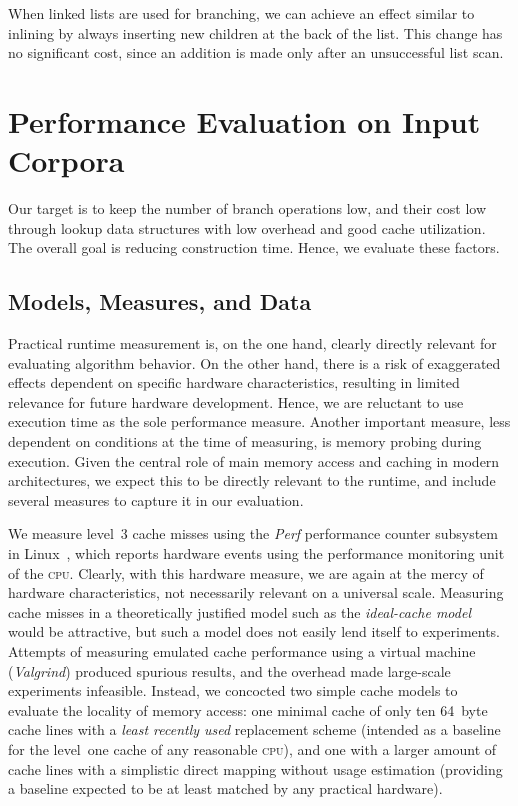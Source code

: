 \documentclass{llncs}
\newcommand\cpu{\textsc{cpu}\xspace}
\begin{document}
When linked lists are used for branching, we can achieve an effect similar to inlining by always inserting new children at the back of the list. This change
has no significant cost, since an addition is made only after an unsuccessful
list scan.

\section{Performance Evaluation on Input Corpora}\label{sec-experiments}

Our target is to keep the number of branch operations low, and
their cost low through lookup data structures with low overhead and good cache
utilization. The overall goal is reducing construction time. Hence, we evaluate
these factors.

\subsection{Models, Measures, and Data}\label{sec-expmodel}

Practical runtime measurement is, on the one
hand, clearly directly relevant for evaluating algorithm behavior. On the other
hand, there is a risk of exaggerated effects dependent on specific hardware
characteristics, resulting in limited relevance for future hardware
development. Hence, we are reluctant to use execution time as the sole performance measure. Another important measure, less dependent on conditions at the
time of measuring, is memory probing during execution. Given the
central role of main memory access and caching in modern architectures, we
expect this to be directly relevant to the
runtime, and include several measures to capture it in our evaluation.




We measure level~3 cache misses using the \emph{Perf} performance counter
subsystem in Linux~\cite{PerfSystem}, which reports hardware events using the
performance monitoring unit of the \cpu. Clearly, with this hardware measure,
we are again at the mercy of hardware characteristics, not necessarily relevant on
a universal scale. Measuring cache misses in a
theoretically justified model such as the \emph{ideal-cache
  model}~\cite{FrigoCacheObliv} would be attractive, but such a model does not easily lend itself
to experiments. Attempts of measuring emulated cache performance using a
virtual machine (\!\emph{Valgrind}) produced spurious results, and the overhead
made large-scale experiments infeasible. Instead, we concocted two simple cache
models to evaluate the locality of memory access: one minimal
cache of only ten 64~byte cache lines with a \emph{least recently used}
replacement scheme (intended as a baseline for the level~one cache of any
reasonable \cpu), and one with a larger amount of cache lines with a simplistic
direct mapping without usage estimation (providing a baseline expected to be at
least matched by any practical hardware).
\end{document}
